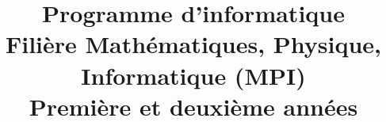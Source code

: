 \documentclass[a4paper]{article}
\begin{document}
\title{Programme d'informatique\\Filière Mathématiques, Physique, Informatique (MPI)\\Première et deuxième années}

\maketitle
\thispagestyle{fancy}
\clearpage



\tableofcontents
\clearpage



\clearpage

\clearpage

\clearpage
 
\clearpage

\clearpage

\clearpage

\clearpage

\clearpage

\clearpage


\clearpage
\appendix

\clearpage

\end{document}
